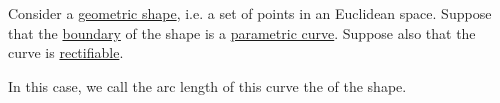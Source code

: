 \begin{definition}\label{def:perimeter}
  Consider a \hyperref[rem:geometric_shape]{geometric shape}, i.e. a set of points in an Euclidean space. Suppose that the \hyperref[def:topological_boundary_operator]{boundary} of the shape is a \hyperref[def:parametric_curve]{parametric curve}. Suppose also that the curve is \hyperref[def:arc_length]{rectifiable}.

  In this case, we call the arc length of this curve the  of the shape.
\end{definition}
